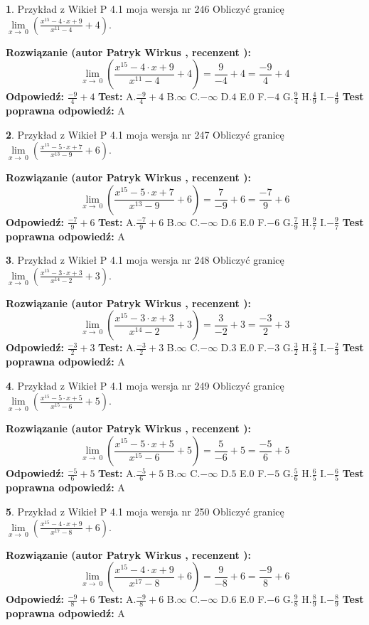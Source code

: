 \documentclass[12pt, a4paper]{article}
\theoremstyle{definition} %
\newtheorem{zad}{}
\newcommand{\zadStart}[1]{\begin{zad}#1\newline}
\newcommand{\zadStop}{\end{zad}}
\newcommand{\rozwStart}[2]{\noindent \textbf{Rozwiązanie (autor #1 , recenzent #2): }\newline}
\newcommand{\rozwStop}{\newline}
\newcommand{\odpStart}{\noindent \textbf{Odpowiedź:}\newline}
\newcommand{\odpStop}{\newline}
\newcommand{\testStart}{\noindent \textbf{Test:}\newline}
\newcommand{\testStop}{\newline}
\newcommand{\kluczStart}{\noindent \textbf{Test poprawna odpowiedź:}\newline}
\newcommand{\kluczStop}{\newline}
\begin{document}
\zadStart{Przykład z Wikieł P 4.1 moja wersja nr 246}
Obliczyć granicę $\lim\limits_{x\to\ 0}(\frac{x^{15}-4 \cdot x +9}{x^{11}-4}+4)$.
\zadStop
\rozwStart{Patryk Wirkus}{}
$$\lim\limits_{x\to\ 0}(\frac{x^{15}-4 \cdot x +9}{x^{11}-4}+4)=\frac{9}{-4}+4=\frac{-9}{4}+4$$
\rozwStop
\odpStart
$\frac{-9}{4}+4$
\odpStop
\testStart
A.$\frac{-9}{4}+4$
B.$\infty$
C.$-\infty$
D.$4$
E.$0$
F.$-4$
G.$\frac{9}{4}$
H.$\frac{4}{9}$
I.$-\frac{4}{9}$
\testStop
\kluczStart
A
\kluczStop



\zadStart{Przykład z Wikieł P 4.1 moja wersja nr 247}
Obliczyć granicę $\lim\limits_{x\to\ 0}(\frac{x^{15}-5 \cdot x +7}{x^{13}-9}+6)$.
\zadStop
\rozwStart{Patryk Wirkus}{}
$$\lim\limits_{x\to\ 0}(\frac{x^{15}-5 \cdot x +7}{x^{13}-9}+6)=\frac{7}{-9}+6=\frac{-7}{9}+6$$
\rozwStop
\odpStart
$\frac{-7}{9}+6$
\odpStop
\testStart
A.$\frac{-7}{9}+6$
B.$\infty$
C.$-\infty$
D.$6$
E.$0$
F.$-6$
G.$\frac{7}{9}$
H.$\frac{9}{7}$
I.$-\frac{9}{7}$
\testStop
\kluczStart
A
\kluczStop



\zadStart{Przykład z Wikieł P 4.1 moja wersja nr 248}
Obliczyć granicę $\lim\limits_{x\to\ 0}(\frac{x^{15}-3 \cdot x +3}{x^{14}-2}+3)$.
\zadStop
\rozwStart{Patryk Wirkus}{}
$$\lim\limits_{x\to\ 0}(\frac{x^{15}-3 \cdot x +3}{x^{14}-2}+3)=\frac{3}{-2}+3=\frac{-3}{2}+3$$
\rozwStop
\odpStart
$\frac{-3}{2}+3$
\odpStop
\testStart
A.$\frac{-3}{2}+3$
B.$\infty$
C.$-\infty$
D.$3$
E.$0$
F.$-3$
G.$\frac{3}{2}$
H.$\frac{2}{3}$
I.$-\frac{2}{3}$
\testStop
\kluczStart
A
\kluczStop



\zadStart{Przykład z Wikieł P 4.1 moja wersja nr 249}
Obliczyć granicę $\lim\limits_{x\to\ 0}(\frac{x^{15}-5 \cdot x +5}{x^{15}-6}+5)$.
\zadStop
\rozwStart{Patryk Wirkus}{}
$$\lim\limits_{x\to\ 0}(\frac{x^{15}-5 \cdot x +5}{x^{15}-6}+5)=\frac{5}{-6}+5=\frac{-5}{6}+5$$
\rozwStop
\odpStart
$\frac{-5}{6}+5$
\odpStop
\testStart
A.$\frac{-5}{6}+5$
B.$\infty$
C.$-\infty$
D.$5$
E.$0$
F.$-5$
G.$\frac{5}{6}$
H.$\frac{6}{5}$
I.$-\frac{6}{5}$
\testStop
\kluczStart
A
\kluczStop



\zadStart{Przykład z Wikieł P 4.1 moja wersja nr 250}
Obliczyć granicę $\lim\limits_{x\to\ 0}(\frac{x^{15}-4 \cdot x +9}{x^{17}-8}+6)$.
\zadStop
\rozwStart{Patryk Wirkus}{}
$$\lim\limits_{x\to\ 0}(\frac{x^{15}-4 \cdot x +9}{x^{17}-8}+6)=\frac{9}{-8}+6=\frac{-9}{8}+6$$
\rozwStop
\odpStart
$\frac{-9}{8}+6$
\odpStop
\testStart
A.$\frac{-9}{8}+6$
B.$\infty$
C.$-\infty$
D.$6$
E.$0$
F.$-6$
G.$\frac{9}{8}$
H.$\frac{8}{9}$
I.$-\frac{8}{9}$
\testStop
\kluczStart
A
\kluczStop
\end{document}
